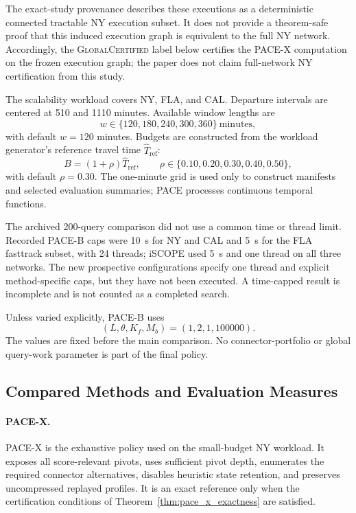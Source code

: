 \documentclass[a4paper,fleqn]{cas-dc}
\begin{document}
The exact-study provenance describes these executions as a deterministic connected tractable NY execution subset. It does not provide a theorem-safe proof that this induced execution graph is equivalent to the full NY network. Accordingly, the \textsc{GlobalCertified} label below certifies the PACE-X computation on the frozen execution graph; the paper does not claim full-network NY certification from this study.

The scalability workload covers NY, FLA, and CAL. Departure intervals are centered at 510 and 1110 minutes. Available window lengths are
\[
w\in\{120,180,240,300,360\}\ \text{minutes},
\]
with default \(w=120\) minutes. Budgets are constructed from the workload generator's reference travel time \(\widehat T_{\mathrm{ref}}\):
\[
B=(1+\rho)\widehat T_{\mathrm{ref}},
\qquad
\rho\in\{0.10,0.20,0.30,0.40,0.50\},
\]
with default \(\rho=0.30\). The one-minute grid is used only to construct manifests and selected evaluation summaries; PACE processes continuous temporal functions.

The archived 200-query comparison did not use a common time or thread limit. Recorded PACE-B caps were 10~s for NY and CAL and 5~s for the FLA fasttrack subset, with 24 threads; iSCOPE used 5~s and one thread on all three networks. The new prospective configurations specify one thread and explicit method-specific caps, but they have not been executed. A time-capped result is incomplete and is not counted as a completed search.

Unless varied explicitly, PACE-B uses
\[
(L,\theta,K_f,M_b)
=(1,2,1,100000).
\]
The values are fixed before the main comparison. No connector-portfolio or global query-work parameter is part of the final policy.

\subsection{Compared Methods and Evaluation Measures}
\label{subsec:exp_methods_metrics}

\paragraph{PACE-X.}
PACE-X is the exhaustive policy used on the small-budget NY workload. It exposes all score-relevant pivots, uses sufficient pivot depth, enumerates the required connector alternatives, disables heuristic state retention, and preserves uncompressed replayed profiles. It is an exact reference only when the certification conditions of Theorem~\ref{thm:pace_x_exactness} are satisfied.
\end{document}
